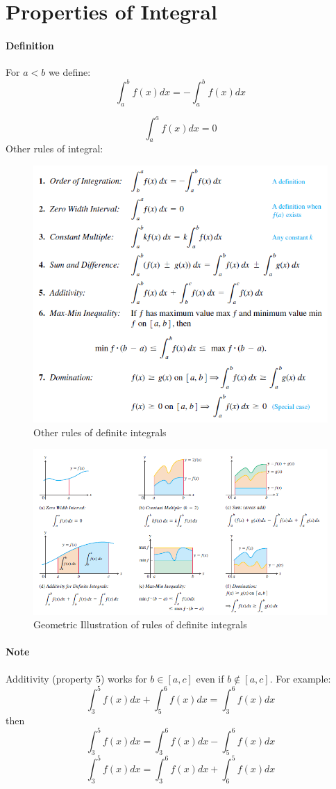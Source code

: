 \documentclass[12pt]{article}
\begin{document}
\section{Properties of Integral}
\paragraph{Definition}
For $a < b$ we define:
\[
    \int_{a}^{b} f(x) dx = - \int_{a}^{b} f(x) dx
\]

\[
    \int_{a}^{a} f(x) dx = 0
\]
Other rules of integral:
\begin{figure}[H]
    \centering
    \includegraphics[width = 0.6\linewidth]{Images/rules of integrals.png}
    \caption{Other rules of definite integrals}
\end{figure}

\begin{figure}[H]
    \centering
    \includegraphics[width = 1\linewidth]{Images/rules of integrals 2.png}
    \caption{Geometric Illustration of rules of definite integrals}
\end{figure}

\paragraph{Note} Additivity (property 5) works for $b \in [a, c]$ even if $b \notin [a, c]$. For example:
\[
    \int_{3}^{5} f(x) dx + \int_{5}^{6} f(x) dx = \int_{3}^{6} f(x) dx
\]
then
\[
    \int_{3}^{5} f(x) dx = \int_{3}^{6} f(x) dx - \int_{5}^{6} f(x) dx
\]
\[
    \int_{3}^{5} f(x) dx = \int_{3}^{6} f(x) dx + \int_{6}^{5} f(x) dx
\]
\end{document}
